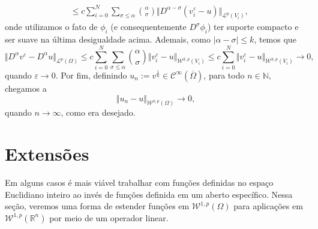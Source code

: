 \documentclass[a4paper, 11pt]{book}
\theoremstyle{definition}
\newcommand{\bN}{\mathbb{N}}
\newcommand{\bR}{\mathbb{R}}
\newcommand{\cC}{\mathcal{C}}
\newcommand{\cL}{\mathcal{L}}
\newcommand{\cW}{\mathcal{W}}
\begin{document}
\begin{prf}
\[\begin{aligned}
            &\leqslant c\sum_{i=0}^N\sum_{\sigma \leqslant \alpha} \binom{\alpha}{\sigma} \Vert D^{\alpha-\sigma}(v^\varepsilon_i - u) \Vert_{\cL^p(V_i)},
        \end{aligned}
    \]
    onde utilizamos o fato de $\phi_i$ (e consequentemente $D^\sigma \phi_i$) ter suporte compacto e ser suave na última desigualdade acima. 
    Ademais, como $|\alpha - \sigma| \leqslant k$, temos que
    \[
        \Vert D^\alpha v^\varepsilon - D^\alpha u \Vert_{\cL^p(\Omega)} \leqslant c \sum_{i=0}^N\sum_{\sigma \leqslant \alpha} \binom{\alpha}{\sigma} \Vert v_i^\varepsilon - u \Vert_{\cW^{k,p}(V_i)} \leqslant c\sum_{i=0}^N \Vert v_i^\varepsilon - u \Vert_{\cW^{k,p}(V_i)} \to 0 ,
    \]
    quando $\varepsilon \to 0$.
    Por fim, definindo $u_n := v^{\frac{1}{n}} \in \cC^{\infty}(\overline\Omega)$, para todo $n \in \bN$, chegamos a 
    \[
        \Vert u_n - u \Vert_{\cW^{k,p}(\Omega)} \to 0,
    \]
    quando $n \to \infty$, como era desejado.
\end{prf}

\section{Extensões}

Em alguns casos é mais viável trabalhar com funções definidas no espaço Euclidiano inteiro ao invés de funções definida em um aberto específico.
Nessa seção, veremos uma forma de estender funções em $\cW^{1,p}(\Omega)$ para aplicações em $\cW^{1,p}(\bR^n)$ por meio de um operador linear.
\end{document}
